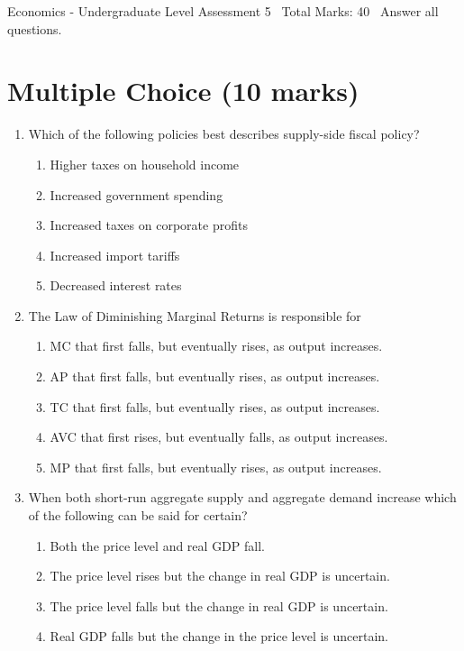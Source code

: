\documentclass[12pt]{article}
\begin{document}
\begin{center}
Economics - Undergraduate Level Assessment 5 \
Total Marks: 40 \
Answer all questions.
\end{center}

\section*{Multiple Choice (10 marks)}
\begin{enumerate}[label=\arabic*.]
\item Which of the following policies best describes supply-side fiscal policy?
\begin{enumerate}[label=(\alph*)]
    \item Higher taxes on household income
    \item Increased government spending
    \item Increased taxes on corporate profits
    \item Increased import tariffs
    \item Decreased interest rates
\end{enumerate}
\item The Law of Diminishing Marginal Returns is responsible for
\begin{enumerate}[label=(\alph*)]
    \item MC that first falls, but eventually rises, as output increases.
    \item AP that first falls, but eventually rises, as output increases.
    \item TC that first falls, but eventually rises, as output increases.
    \item AVC that first rises, but eventually falls, as output increases.
    \item MP that first falls, but eventually rises, as output increases.
\end{enumerate}
\item When both short-run aggregate supply and aggregate demand increase which of the following can be said for certain?
\begin{enumerate}[label=(\alph*)]
    \item Both the price level and real GDP fall.
    \item The price level rises but the change in real GDP is uncertain.
    \item The price level falls but the change in real GDP is uncertain.
    \item Real GDP falls but the change in the price level is uncertain.

\end{enumerate}
\end{enumerate}
\end{document}
